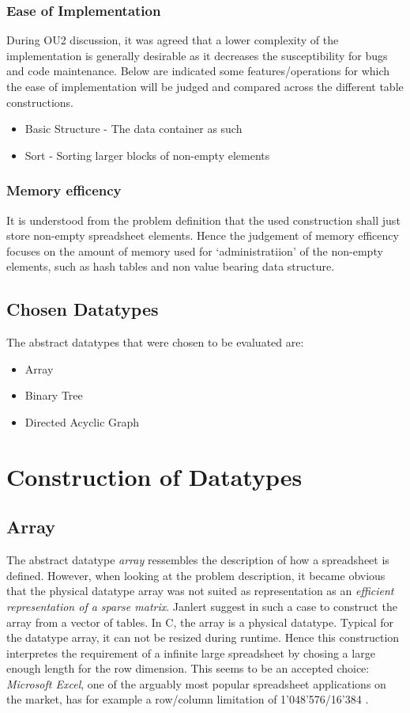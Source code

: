 \documentclass[a4paper,11pt,twoside]{article}
\begin{document}
\subsubsection{Ease of Implementation}
During OU2 discussion, it was agreed that a lower complexity
of the implementation is generally desirable as it decreases the
susceptibility for bugs and code maintenance. Below are indicated some
features/operations for which the ease of implementation will be
judged and compared across the different table constructions.

\begin{itemize}
\item Basic Structure - The data container as such
\item Sort - Sorting larger blocks of non-empty elements
\end{itemize}

\subsubsection{Memory efficency}
It is understood from the problem definition that the used
construction shall just store non-empty spreadsheet elements. Hence
the judgement of memory efficency focuses on the amount of
memory used for `administratiion' of the non-empty elements, such as
hash tables and non value bearing data structure. 


\subsection{Chosen Datatypes}
The abstract datatypes that were chosen to be evaluated are:
\begin{itemize}
\item Array
\item Binary Tree
\item Directed Acyclic Graph
\end{itemize}



\section{Construction of Datatypes}
\subsection{Array}
The abstract datatype \emph{array} ressembles the description of 
how a spreadsheet is defined. However, when looking at the problem 
description, it became obvious that the physical datatype array was 
not suited as representation as an \emph{efficient representation of a
 sparse matrix}. Janlert \cite[pp 101-103]{janlert2000} suggest in
such a case to construct the array from a vector of tables. In C, the
array is a physical datatype. Typical for the datatype array, it can
not be resized during runtime. Hence this construction interpretes the
requirement of a infinite large spreadsheet by chosing a large enough
length for the row dimension. This seems to be an accepted choice:
\textit{Microsoft Excel}, one of the arguably most popular spreadsheet
applications on the market, has for example a row/column limitation of
1'048'576/16'384 \cite{excel_limit}.
\end{document}
